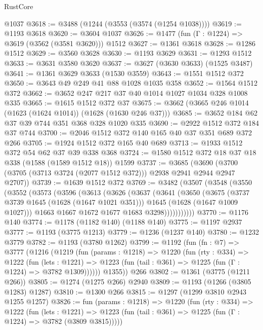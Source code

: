 \begin{lexlean}{RustCore}
\begin{coremodule}
    @1037
@3618 := @3488 (@1244 (@3553 (@3574 (@1254 @1038))))
@3619 := @1193 @3618
@3620 := @3604 @1037
@3626 := @1477 (fun (Γ : @1224) => @3619 (@3562 (@3581 @3620))) @1512
@3627 := @1361 @3618
@3628 := @1286 @1512
@3629 := @3560 @3628
@3630 := @1193 @3629
@3631 := @1293 @1512
@3633 := @3631 @3580 @3620
@3637 := @3627 (@3630 @3633) (@1525 @3487)
@3641 := @1361 @3629 @3633 (@1530 @3559)
@3643 := @1551 @1512 @372
@3650 := @3643 @49 @249 @41 @88 @1028 @1035 @358
@3652 := @1564 @1512 @372
@3662 := @3652 @247 @217 @37 @40 @1014 @1027 @1034 @328 @1008 @335
@3665 := @1615 @1512 @372 @37
@3675 := @3662 (@3665 @246 @1014 (@1623 (@1624 @1014)) (@1628 (@1630 @246 @37)))
@3685 := @3652 @184 @62 @37 @39 @744 @351 @368 @328 @1020 @335
@3690 := @2922 @1512 @372 @184 @37 @744
@3700 := @2046 @1512 @372 @140 @165 @40 @37 @351 @689 @372 @266
@3705 := @1924 @1512 @372 @165 @40 @689
@3713 := @1933 @1512 @372 @54 @62 @37 @39 @338 @368
@3724 := @1580 @1512 @372 @18 @37 @18 @338 (@1588 (@1589 @1512 @18)) @1599
@3737 := @3685
    (@3690 (@3700 (@3705 (@3713 @3724 (@2077 @1512 @372))) @2938 @2941 @2944 @2947 @2707))
@3739 := @1639 @1512 @372
@3769 := @3482
    (@3507
      (@3548
        (@3550
          (@3552
            (@3573
              (@3596
                (@3613
                  (@3626
                    (@3637
                      (@3641
                        (@3650
                          (@3675
                            (@3737 @3739 @1645 (@1628 (@1647 @1021 @351)))
                            @1645
                            (@1628 (@1647 @1009 @1027)))
                          @1663
                          @1667
                          @1672
                          @1677
                          @1683
                          @3298)))))))))))
@3770 := @1176 @140
@3774 := @1178 (@1182 @140) (@1188 @140)
@3775 := @1197 @2937
@3777 := @1193 (@3775 @1213)
@3779 := @1236 (@1237 @140)
@3780 := @1232 @3779
@3782 := @1193 (@3780 @1262)
@3799 := @1192
    (fun (fn : @7) =>
    @3777
      (@1216
        (@1219
          (fun (params : @1218) =>
          @1220
            (fun (rty : @334) =>
            @1222
              (fun (lets : @1221) =>
              @1223 (fun (tail : @361) => @1225 (fun (Γ : @1224) => @3782 @1309))))))
        @1355))
    @266
@3802 := @1361 (@3775 (@1211 @266))
@3805 := @1274 (@1275 @266) @2940
@3809 := @1193 (@1266 (@3805 @1283) @1287)
@3810 := @1300 @266
@3815 := @1297 (@1299 @3810 @2943 @1255 @1257)
@3826 := fun (params : @1218) =>
  @1220
    (fun (rty : @334) =>
    @1222
      (fun (lets : @1221) =>
      @1223 (fun (tail : @361) => @1225 (fun (Γ : @1224) => @3782 (@3809 @3815)))))

\end{coremodule}
\end{lexlean}
